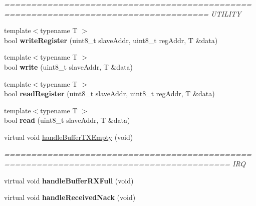 \begin{DoxyCompactItemize}
\begin{DoxyCompactList}\small\item\em ==================================================================================== U\+T\+I\+L\+I\+T\+Y \end{DoxyCompactList}\item 
\hypertarget{classyahal_1_1mcu_1_1_i2_c__master_a96a0c05ef0cbfc1701571ee32d9901b7}{}{\footnotesize template$<$typename T $>$ }\\bool {\bfseries write\+Register} (uint8\+\_\+t slave\+Addr, uint8\+\_\+t reg\+Addr, T \&data)\label{classyahal_1_1mcu_1_1_i2_c__master_a96a0c05ef0cbfc1701571ee32d9901b7}

\item 
\hypertarget{classyahal_1_1mcu_1_1_i2_c__master_ab04427f7a2c279f85897c569980e5028}{}{\footnotesize template$<$typename T $>$ }\\bool {\bfseries write} (uint8\+\_\+t slave\+Addr, T \&data)\label{classyahal_1_1mcu_1_1_i2_c__master_ab04427f7a2c279f85897c569980e5028}

\item 
\hypertarget{classyahal_1_1mcu_1_1_i2_c__master_adfe3bfaf21ca6242b136d7a98801c2d1}{}{\footnotesize template$<$typename T $>$ }\\bool {\bfseries read\+Register} (uint8\+\_\+t slave\+Addr, uint8\+\_\+t reg\+Addr, T \&data)\label{classyahal_1_1mcu_1_1_i2_c__master_adfe3bfaf21ca6242b136d7a98801c2d1}

\item 
\hypertarget{classyahal_1_1mcu_1_1_i2_c__master_a47a3ab29396a9a55e219420b16e93294}{}{\footnotesize template$<$typename T $>$ }\\bool {\bfseries read} (uint8\+\_\+t slave\+Addr, T \&data)\label{classyahal_1_1mcu_1_1_i2_c__master_a47a3ab29396a9a55e219420b16e93294}

\item 
\hypertarget{classyahal_1_1mcu_1_1_i2_c__master_af7b36228ed09e8aac886f4d4325b1c1e}{}virtual void \hyperlink{classyahal_1_1mcu_1_1_i2_c__master_af7b36228ed09e8aac886f4d4325b1c1e}{handle\+Buffer\+T\+X\+Empty} (void)\label{classyahal_1_1mcu_1_1_i2_c__master_af7b36228ed09e8aac886f4d4325b1c1e}

\begin{DoxyCompactList}\small\item\em ======================================================================================== I\+R\+Q \end{DoxyCompactList}\item 
\hypertarget{classyahal_1_1mcu_1_1_i2_c__master_a0902de640df4a6a0a95f5ad526c20495}{}virtual void {\bfseries handle\+Buffer\+R\+X\+Full} (void)\label{classyahal_1_1mcu_1_1_i2_c__master_a0902de640df4a6a0a95f5ad526c20495}

\item 
\hypertarget{classyahal_1_1mcu_1_1_i2_c__master_a2a3d46c9ad4ef297f05ec628e86293ea}{}virtual void {\bfseries handle\+Received\+Nack} (void)\label{classyahal_1_1mcu_1_1_i2_c__master_a2a3d46c9ad4ef297f05ec628e86293ea}

\end{DoxyCompactItemize}
